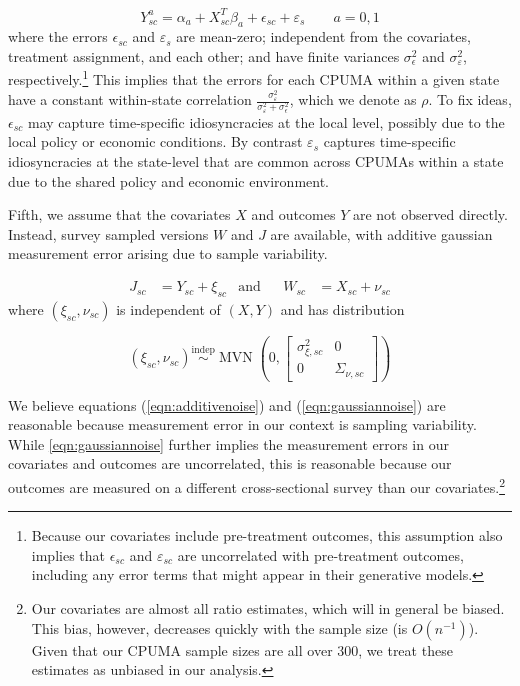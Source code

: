 \documentclass[aoas]{imsart}
\theoremstyle{plain}
\theoremstyle{remark}
\begin{document}
\begin{equation}\label{eqn:linmod}
Y_{sc}^a = \alpha_a + X_{sc}^T\beta_a + \epsilon_{sc} + \varepsilon_s \qquad a = 0, 1
\end{equation}
%
where the errors $\epsilon_{sc}$ and $\varepsilon_{s}$ are mean-zero; independent from the covariates, treatment assignment, and each other; and have finite variances $\sigma^2_{\epsilon}$ and $\sigma^2_{\varepsilon}$, respectively.\footnote{Because our covariates include pre-treatment outcomes, this assumption also implies that $\epsilon_{sc}$ and $\varepsilon_{sc}$ are uncorrelated with pre-treatment outcomes, including any error terms that might appear in their generative models.} This implies that the errors for each CPUMA within a given state have a constant within-state correlation $\frac{\sigma^2_{\varepsilon}}{\sigma^2_{\varepsilon} + \sigma^2_{\epsilon}}$, which we denote as $\rho$. To fix ideas, $\epsilon_{sc}$ may capture time-specific idiosyncracies at the local level, possibly due to the local policy or economic conditions. By contrast $\varepsilon_s$ captures time-specific idiosyncracies at the state-level that are common across CPUMAs within a state due to the shared policy and economic environment.

Fifth, we assume that the covariates $X$ and outcomes $Y$ are not observed directly. Instead, survey sampled versions $W$ and $J$ are available, with additive gaussian measurement error arising due to sample variability.

\begin{align} \label{eqn:additivenoise}
	J_{sc} & = Y_{sc} + \xi_{sc} & \text{and} & & W_{sc} & = X_{sc} + \nu_{sc}
\end{align}
where $(\xi_{sc}, \nu_{sc})$ is independent of $(X, Y)$ and has distribution

\begin{equation} \label{eqn:gaussiannoise}
 (\xi_{sc}, \nu_{sc}) \stackrel{\text{indep}}{\sim} \operatorname{MVN}\left(0, \left[\begin{array}{cc} \sigma_{\xi,sc}^2 & 0 \\ 0 & \Sigma_{\nu, sc} \end{array}\right] \right)
\end{equation}

We believe equations (\ref{eqn:additivenoise}) and (\ref{eqn:gaussiannoise}) are reasonable because measurement error in our context is sampling variability. While \eqref{eqn:gaussiannoise} further implies the measurement errors in our covariates and outcomes are uncorrelated, this is reasonable because our outcomes are measured on a different cross-sectional survey than our covariates.\footnote{Our covariates are almost all ratio estimates, which will in general be biased. This bias, however, decreases quickly with the sample size (is $O(n^{-1})$). Given that our CPUMA sample sizes are all over 300, we treat these estimates as unbiased in our analysis.} 
\end{document}
